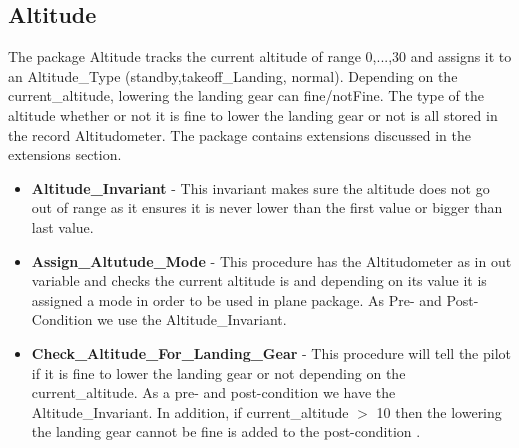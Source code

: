 \documentclass{llncs}
\begin{document}
\subsection{Altitude}
The package Altitude tracks the current altitude of range 0,...,30 and assigns it to an Altitude\_Type (standby,takeoff\_Landing, normal). Depending on the current\_altitude, lowering the landing gear can fine/notFine. The type of the altitude whether or not it is fine to lower the landing gear or not is all stored in the record Altitudometer. The package contains extensions discussed in the extensions section.
\begin{itemize}
\item \textbf{Altitude\_Invariant} - This invariant makes sure the altitude does not go out of range as it ensures it is never lower than the first value or bigger than last value. 
\item \textbf{Assign\_Altutude\_Mode} - This procedure has the Altitudometer as in out variable and checks the current altitude is and depending on its value it is assigned a mode in order to be used in plane package. As Pre- and Post-Condition we use the Altitude\_Invariant.
\item \textbf{Check\_Altitude\_For\_Landing\_Gear} - This procedure will tell the pilot if it is fine to lower the landing gear or not depending on the current\_altitude. As a pre- and post-condition we have the Altitude\_Invariant. In addition, if current\_altitude $>$ 10 then the lowering the landing gear cannot be fine is added to the post-condition .  
\end{itemize}
\end{document}

